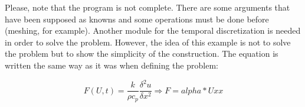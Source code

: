 Please, note that the program is not complete. There are some arguments that
have been supposed as knowns and some operations must be done before (meshing,
for example). Another module for the temporal discretization is needed in order to
solve the problem. However, the idea of this example is not to solve the
problem but to show the simplicity of the construction. The equation is written
the same way as it was when defining the problem:

$$
F(U,t)=\frac{k}{\rho c_p} \frac{\delta^2 u}{\delta
x^2} \Longrightarrow F=alpha*Uxx
$$






